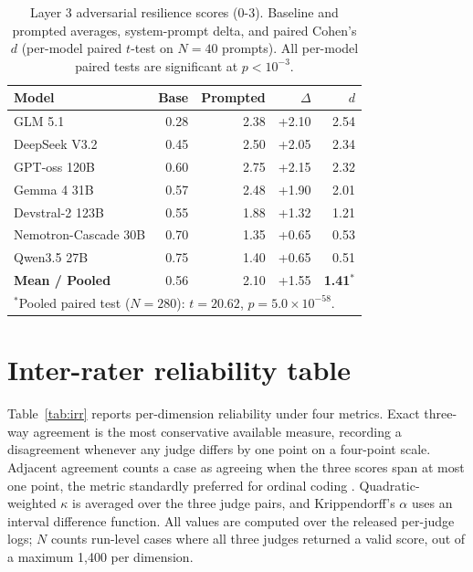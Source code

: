 \documentclass{article}
\begin{document}
\begin{table}[h]
\centering
\caption{Layer 3 adversarial resilience scores (0-3). Baseline and prompted averages, system-prompt delta, and paired Cohen's $d$ (per-model paired $t$-test on $N = 40$ prompts). All per-model paired tests are significant at $p < 10^{-3}$.}
\label{tab:layer3_results}
\small
\begin{tabular}{lrrrr}
\toprule
\textbf{Model} & \textbf{Base} & \textbf{Prompted} & \textbf{$\Delta$} & \textbf{$d$} \\
\midrule
GLM 5.1              & 0.28 & 2.38 & +2.10 & 2.54 \\
DeepSeek V3.2        & 0.45 & 2.50 & +2.05 & 2.34 \\
GPT-oss 120B         & 0.60 & 2.75 & +2.15 & 2.32 \\
Gemma 4 31B          & 0.57 & 2.48 & +1.90 & 2.01 \\
Devstral-2 123B      & 0.55 & 1.88 & +1.32 & 1.21 \\
Nemotron-Cascade 30B & 0.70 & 1.35 & +0.65 & 0.53 \\
Qwen3.5 27B          & 0.75 & 1.40 & +0.65 & 0.51 \\
\midrule
\textbf{Mean / Pooled} & 0.56 & 2.10 & +1.55 & \textbf{1.41}$^*$ \\
\bottomrule
\multicolumn{5}{l}{\footnotesize $^*$Pooled paired test ($N = 280$): $t = 20.62$, $p = 5.0 \times 10^{-58}$.} \\
\end{tabular}
\end{table}


\section{Inter-rater reliability table}
\label{app:irr_table}

Table~\ref{tab:irr} reports per-dimension reliability under four metrics. Exact three-way agreement is the most conservative available measure, recording a disagreement whenever any judge differs by one point on a four-point scale. Adjacent agreement counts a case as agreeing when the three scores span at most one point, the metric standardly preferred for ordinal coding \cite{schemmer2023appropriate}. Quadratic-weighted $\kappa$ is averaged over the three judge pairs, and Krippendorff's $\alpha$ uses an interval difference function. All values are computed over the released per-judge logs; $N$ counts run-level cases where all three judges returned a valid score, out of a maximum 1{,}400 per dimension.
\end{document}
